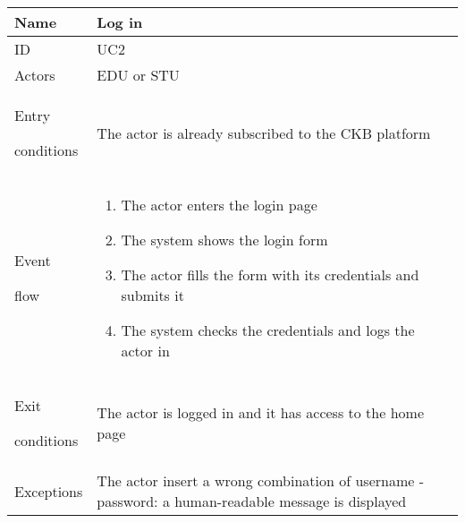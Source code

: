 \begin{center}
    \def\arraystretch{1.5}
    \begin{tabular}{| m{2cm} | m{10cm}|}
        \hline
        Name                  & Log in                                                                                             \\ \hline
        ID                    & UC2                                                                                                \\ \hline
        Actors                & EDU or STU                                                                                         \\ \hline
        Entry \par conditions & The actor is already subscribed to the CKB platform                                                \\ \hline
        Event \par flow       & \begin{enumerate}
                                    \item The actor enters the login page
                                    \item The system shows the login form
                                    \item The actor fills the form with its credentials and submits it
                                    \item The system checks the credentials and logs the actor in
                                \end{enumerate}                                  \\ \hline
        Exit \par conditions  & The actor is logged in and it has access to the home page                                          \\ \hline
        Exceptions            & The actor insert a wrong combination of username - password: a human-readable message is displayed \\ \hline
    \end{tabular}
\end{center}

